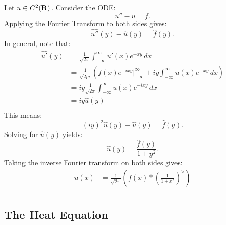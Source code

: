 \begin{example}
	Let $u \in C^2(\mathbf{R})$. Consider the ODE:
	\[
		u''-u = f.
	\] 
	Applying the Fourier Transform to both sides gives:
	\[
		\hat{u''}(y) - \hat{u}(y) = \hat{f}(y).
	\] 
	In general, note that:
	\begin{align*}
		\hat{u'}(y)
		&= \frac{1}{\sqrt{2\pi}}\int_{-\infty}^{\infty} u'(x) e^{-xy}\,dx \\
		&=  \frac{1}{\sqrt{2pi}} \left( f(x) e^{-ixy} \Big|^\infty_{-\infty} + iy \int_{-\infty}^{\infty} u(x) e^{-xy}\,dx\right) \\
		&= iy \frac{1}{\sqrt{2\pi}} \int_{-\infty}^{\infty} u(x)e^{-ixy}\,dx\\
		&= iy \hat{u}(y) \\
	\end{align*}
	This means:
	\[
		(iy)^2 \hat{u}(y) - \hat{u}(y) = \hat{f}(y).
	\] 
	Solving for $\hat{u}(y)$ yields:
	\[
		\hat{u}(y) = \frac{\hat{f}(y)}{1+y^2}.
	\] 
	Taking the inverse Fourier transform on both sides gives:
	\begin{align*}
		u(x)
		&= \frac{1}{\sqrt{2\pi}} \left(f(x) \ast \left(\frac{1}{1+x^2}\right)^\vee \right) \\
	\end{align*}
\end{example}

\subsection{The Heat Equation}
